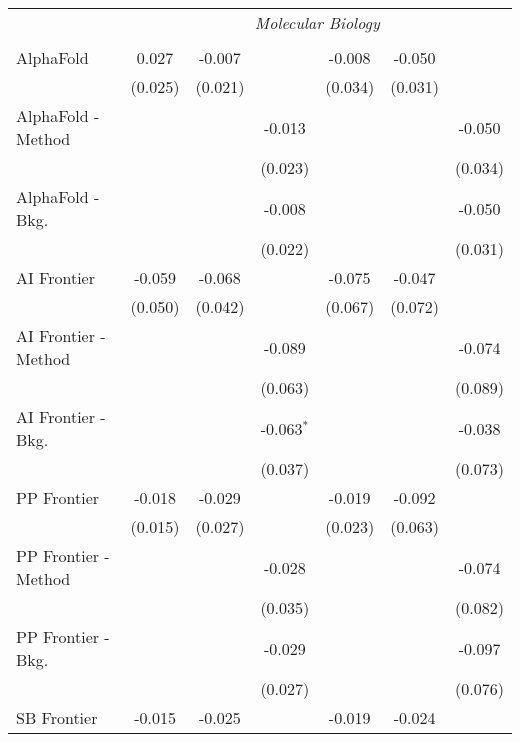 \begin{tabular}{lcccccc}
 & \multicolumn{6}{c}{\textit{Molecular Biology}} \\ \\
   AlphaFold            & 0.027   & -0.007  &              & -0.008  & -0.050  &   \\   
                        & (0.025) & (0.021) &              & (0.034) & (0.031) &   \\   
   AlphaFold - Method   &         &         & -0.013       &         &         & -0.050\\   
                        &         &         & (0.023)      &         &         & (0.034)\\   
   AlphaFold - Bkg.     &         &         & -0.008       &         &         & -0.050\\   
                        &         &         & (0.022)      &         &         & (0.031)\\   
   AI Frontier          & -0.059  & -0.068  &              & -0.075  & -0.047  &   \\   
                        & (0.050) & (0.042) &              & (0.067) & (0.072) &   \\   
   AI Frontier - Method &         &         & -0.089       &         &         & -0.074\\   
                        &         &         & (0.063)      &         &         & (0.089)\\   
   AI Frontier - Bkg.   &         &         & -0.063$^{*}$ &         &         & -0.038\\   
                        &         &         & (0.037)      &         &         & (0.073)\\   
   PP Frontier          & -0.018  & -0.029  &              & -0.019  & -0.092  &   \\   
                        & (0.015) & (0.027) &              & (0.023) & (0.063) &   \\   
   PP Frontier - Method &         &         & -0.028       &         &         & -0.074\\   
                        &         &         & (0.035)      &         &         & (0.082)\\   
   PP Frontier - Bkg.   &         &         & -0.029       &         &         & -0.097\\   
                        &         &         & (0.027)      &         &         & (0.076)\\   
   SB Frontier          & -0.015  & -0.025  &              & -0.019  & -0.024  &   \\   

\end{tabular}
